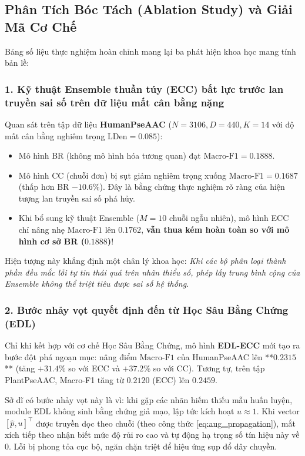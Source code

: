 \documentclass[1p,times]{elsarticle}
\begin{document}
\subsection{Phân Tích Bóc Tách (Ablation Study) và Giải Mã Cơ Chế}
Bảng số liệu thực nghiệm hoàn chỉnh mang lại ba phát hiện khoa học mang tính bản lề:

\subsubsection{1. Kỹ thuật Ensemble thuần túy (ECC) bất lực trước lan truyền sai số trên dữ liệu mất cân bằng nặng}
Quan sát trên tập dữ liệu \textbf{HumanPseAAC} ($N=3106, D=440, K=14$ với độ mất cân bằng nghiêm trọng $\text{LDen} = 0.085$):
\begin{itemize}
    \item Mô hình BR (không mô hình hóa tương quan) đạt $\text{Macro-F1} = 0.1888$.
    \item Mô hình CC (chuỗi đơn) bị sụt giảm nghiêm trọng xuống $\text{Macro-F1} = 0.1687$ (thấp hơn BR $-10.6\%$). Đây là bằng chứng thực nghiệm rõ ràng của hiện tượng lan truyền sai số phá hủy.
    \item Khi bổ sung kỹ thuật Ensemble ($M=10$ chuỗi ngẫu nhiên), mô hình ECC chỉ nâng nhẹ $\text{Macro-F1}$ lên $0.1762$, \textbf{vẫn thua kém hoàn toàn so với mô hình cơ sở BR ($0.1888$)}!
\end{itemize}
Hiện tượng này khẳng định một chân lý khoa học: \textit{Khi các bộ phân loại thành phần đều mắc lỗi tự tin thái quá trên nhãn thiểu số, phép lấy trung bình cộng của Ensemble không thể triệt tiêu được sai số hệ thống}. 

\subsubsection{2. Bước nhảy vọt quyết định đến từ Học Sâu Bằng Chứng (EDL)}
Chỉ khi kết hợp với cơ chế Học Sâu Bằng Chứng, mô hình \textbf{EDL-ECC} mới tạo ra bước đột phá ngoạn mục: nâng điểm $\text{Macro-F1}$ của HumanPseAAC lên **$0.2315$** (tăng $+31.4\%$ so với ECC và $+37.2\%$ so với CC). Tương tự, trên tập PlantPseAAC, Macro-F1 tăng từ $0.2120$ (ECC) lên $0.2459$. 

Sở dĩ có bước nhảy vọt này là vì: khi gặp các nhãn hiếm thiếu mẫu huấn luyện, module EDL không sinh bằng chứng giả mạo, lập tức kích hoạt $u \approx 1$. Khi vector $[\hat{p}, u]^\top$ được truyền dọc theo chuỗi (theo công thức \ref{eq:aug_propagation}), mắt xích tiếp theo nhận biết mức độ rủi ro cao và tự động hạ trọng số tín hiệu này về 0. Lỗi bị phong tỏa cục bộ, ngăn chặn triệt để hiệu ứng sụp đổ dây chuyền.
\end{document}

